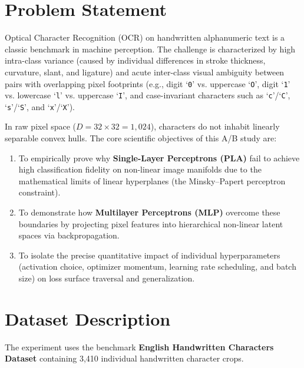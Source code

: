 \documentclass[12pt,a4paper]{article}
\begin{document}
\section{Problem Statement}
Optical Character Recognition (OCR) on handwritten alphanumeric text is a classic benchmark in machine perception. The challenge is characterized by high intra-class variance (caused by individual differences in stroke thickness, curvature, slant, and ligature) and acute inter-class visual ambiguity between pairs with overlapping pixel footprints (e.g., digit `\texttt{0}' vs. uppercase `\texttt{O}', digit `\texttt{1}' vs. lowercase `\texttt{l}' vs. uppercase `\texttt{I}', and case-invariant characters such as `\texttt{c}'/`\texttt{C}', `\texttt{s}'/`\texttt{S}', and `\texttt{x}'/`\texttt{X}').

In raw pixel space ($D = 32 \times 32 = 1,024$), characters do not inhabit linearly separable convex hulls. The core scientific objectives of this A/B study are:
\begin{enumerate}[noitemsep]
    \item To empirically prove why \textbf{Single-Layer Perceptrons (PLA)} fail to achieve high classification fidelity on non-linear image manifolds due to the mathematical limits of linear hyperplanes (the Minsky--Papert perceptron constraint).
    \item To demonstrate how \textbf{Multilayer Perceptrons (MLP)} overcome these boundaries by projecting pixel features into hierarchical non-linear latent spaces via backpropagation.
    \item To isolate the precise quantitative impact of individual hyperparameters (activation choice, optimizer momentum, learning rate scheduling, and batch size) on loss surface traversal and generalization.
\end{enumerate}

\section{Dataset Description}
The experiment uses the benchmark \textbf{English Handwritten Characters Dataset} containing 3,410 individual handwritten character crops.
\end{document}
